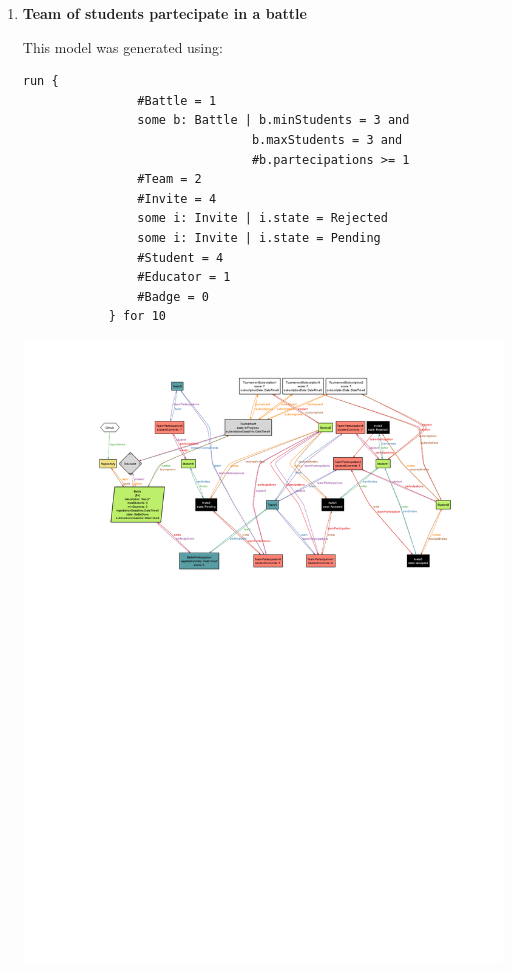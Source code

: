 \begin{enumerate}[label=,leftmargin=0cm]
    \item \textbf{Team of students partecipate in a battle}
          
          This model was generated using:
          \begin{lstlisting}[language=alloy]
            run {
                #Battle = 1 
                some b: Battle | b.minStudents = 3 and 
                                b.maxStudents = 3 and 
                                #b.partecipations >= 1
                #Team = 2
                #Invite = 4
                some i: Invite | i.state = Rejected
                some i: Invite | i.state = Pending
                #Student = 4
                #Educator = 1
                #Badge = 0
            } for 10
          \end{lstlisting}
          
          \begin{adjustbox}{max size={\textwidth}{\textheight}}
              \includegraphics[trim=90 475 60 40, clip]{alloy/invites.pdf}
          \end{adjustbox}
          

\end{enumerate}
